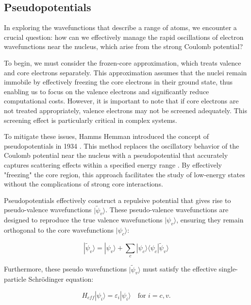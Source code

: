\subsection{Pseudopotentials}


In exploring the wavefunctions that describe a range of atoms, we encounter a crucial question: how can we effectively manage the rapid oscillations of electron wavefunctions near the nucleus, which arise from the strong Coulomb potential? 

To begin, we must consider the frozen-core approximation, which treats valence and core electrons separately. This approximation assumes that the nuclei remain immobile by effectively freezing the core electrons in their ground state, thus enabling us to focus on the valence electrons and significantly reduce computational costs. However, it is important to note that if core electrons are not treated appropriately, valence electrons may not be screened adequately. This screening effect is particularly critical in complex systems.  


To mitigate these issues, Hamms Hemman introduced the concept of pseudopotentials in 1934 \supercite{hellmann1935new}. This method replaces the oscillatory behavior of the Coulomb potential near the nucleus with a pseudopotential that accurately captures scattering effects within a specified energy range \supercite{martin2020electronic}. By effectively "freezing" the core region, this approach facilitates the study of low-energy states without the complications of strong core interactions. 

Pseudopotentials effectively construct a repulsive potential that gives rise to pseudo-valence wavefunctions \( |\tilde{\psi}_v\rangle \). These pseudo-valence wavefunctions are designed to reproduce the true valence wavefunctions \( |\psi_v\rangle \), ensuring they remain orthogonal to the core wavefunctions \( |\psi_c\rangle \):  

\begin{equation}  
	|\tilde{\psi}_v\rangle = |\psi_v\rangle + \sum_{c} |\psi_c\rangle \langle \psi_c | \tilde{\psi}_v\rangle
   \label{eq:2.77}	
\end{equation}  

Furthermore, these pseudo wavefunctions \( |\tilde{\psi}_v\rangle \) must satisfy the effective single-particle Schrödinger equation:  

\begin{equation}  
	H_{eff} | \psi_i \rangle = \varepsilon_i | \psi_i \rangle \quad \text{for } i = c, v.  
\end{equation}  

